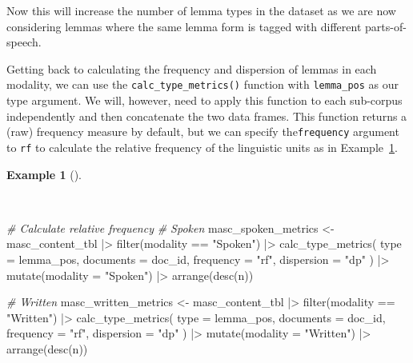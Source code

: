 \documentclass[
  letterpaper,
]{latex/krantz}
\newenvironment{Shaded}{\begin{snugshade}}{\end{snugshade}}
\newcommand{\AttributeTok}[1]{\textcolor[rgb]{0.00,0.00,0.00}{#1}}
\newcommand{\CommentTok}[1]{\textcolor[rgb]{0.00,0.00,0.00}{\textit{#1}}}
\newcommand{\FunctionTok}[1]{\textcolor[rgb]{0.00,0.00,0.00}{#1}}
\newcommand{\NormalTok}[1]{\textcolor[rgb]{0.00,0.00,0.00}{#1}}
\newcommand{\OtherTok}[1]{\textcolor[rgb]{0.00,0.00,0.00}{#1}}
\newcommand{\SpecialCharTok}[1]{\textcolor[rgb]{0.00,0.00,0.00}{#1}}
\newcommand{\StringTok}[1]{\textcolor[rgb]{0.00,0.00,0.00}{#1}}
\theoremstyle{definition}
\newtheorem{example}{Example}[chapter]
\theoremstyle{remark}
\begin{document}
Now this will increase the number of lemma types in the dataset as we
are now considering lemmas where the same lemma form is tagged with
different parts-of-speech.

Getting back to calculating the frequency and dispersion of lemmas in
each modality, we can use the \texttt{calc\_type\_metrics()} function
with \texttt{lemma\_pos} as our type argument. We will, however, need to
apply this function to each sub-corpus independently and then
concatenate the two data frames. This function returns a (raw) frequency
measure by default, but we can specify the\texttt{frequency} argument to
\texttt{rf} to calculate the relative frequency of the linguistic units
as in Example~\ref{exm-eda-masc-metrics-modality}.

\begin{example}[]\protect\hypertarget{exm-eda-masc-metrics-modality}{}\label{exm-eda-masc-metrics-modality}

~

\begin{Shaded}
\begin{Highlighting}[]
\CommentTok{\# Calculate relative frequency}
\CommentTok{\# Spoken}
\NormalTok{masc\_spoken\_metrics }\OtherTok{\textless{}{-}}
\NormalTok{  masc\_content\_tbl }\SpecialCharTok{|\textgreater{}}
  \FunctionTok{filter}\NormalTok{(modality }\SpecialCharTok{==} \StringTok{"Spoken"}\NormalTok{) }\SpecialCharTok{|\textgreater{}}
  \FunctionTok{calc\_type\_metrics}\NormalTok{(}
    \AttributeTok{type =}\NormalTok{ lemma\_pos,}
    \AttributeTok{documents =}\NormalTok{ doc\_id,}
    \AttributeTok{frequency =} \StringTok{"rf"}\NormalTok{,}
    \AttributeTok{dispersion =} \StringTok{"dp"}
\NormalTok{  ) }\SpecialCharTok{|\textgreater{}}
  \FunctionTok{mutate}\NormalTok{(}\AttributeTok{modality =} \StringTok{"Spoken"}\NormalTok{) }\SpecialCharTok{|\textgreater{}}
  \FunctionTok{arrange}\NormalTok{(}\FunctionTok{desc}\NormalTok{(n))}

\CommentTok{\# Written}
\NormalTok{masc\_written\_metrics }\OtherTok{\textless{}{-}}
\NormalTok{  masc\_content\_tbl }\SpecialCharTok{|\textgreater{}}
  \FunctionTok{filter}\NormalTok{(modality }\SpecialCharTok{==} \StringTok{"Written"}\NormalTok{) }\SpecialCharTok{|\textgreater{}}
  \FunctionTok{calc\_type\_metrics}\NormalTok{(}
    \AttributeTok{type =}\NormalTok{ lemma\_pos,}
    \AttributeTok{documents =}\NormalTok{ doc\_id,}
    \AttributeTok{frequency =} \StringTok{"rf"}\NormalTok{,}
    \AttributeTok{dispersion =} \StringTok{"dp"}
\NormalTok{  ) }\SpecialCharTok{|\textgreater{}}
  \FunctionTok{mutate}\NormalTok{(}\AttributeTok{modality =} \StringTok{"Written"}\NormalTok{) }\SpecialCharTok{|\textgreater{}}
  \FunctionTok{arrange}\NormalTok{(}\FunctionTok{desc}\NormalTok{(n))}


\end{Highlighting}
\end{Shaded}
\end{example}
\end{document}
